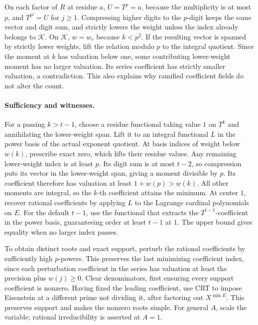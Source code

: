 \documentclass[11pt]{article}
\begin{document}
On each factor of \(R\) at residue \(a\), \(U=T^p=a\),
because the multiplicity is at most \(p\), and \(T^{p^j}=U\)
for \(j\ge1\). Compressing higher digits to the \(p\)-digit keeps
the same vector and digit sum, and strictly lowers the weight
unless the index already belongs to \(\mathcal K\).
On \(\mathcal K\), \(w=w_r\) because \(k<p^2\).
If the resulting vector is spanned by strictly lower weights,
lift the relation modulo \(p\) to the integral quotient.
Since the moment at \(k\) has valuation below one, some
contributing lower-weight moment has no larger valuation.
Its series coefficient has strictly smaller valuation,
a contradiction. This also explains why ramified coefficient
fields do not alter the count.

\paragraph{Sufficiency and witnesses.}
For a passing \(k>t-1\), choose a residue functional taking value
\(1\) on \(T^k\) and annihilating the lower-weight span.
Lift it to an integral functional \(L\) in the power basis of
the actual exponent quotient. At basis indices of weight below
\(w(k)\), prescribe exact zero, which lifts their residue values.
Any remaining lower-weight index is at least \(p\).
Its digit sum is at most \(t-2\), so compression puts its vector
in the lower-weight span, giving a moment divisible by \(p\).
Its coefficient therefore has valuation at least \(1+w(p)>w(k)\).
All other moments are integral, so the \(k\)-th coefficient
attains the minimum. At center \(1\), recover rational coefficients
by applying \(L\) to the Lagrange cardinal polynomials on \(E\).
For the default \(t-1\), use the functional that extracts the
\(T^{t-1}\)-coefficient in the power basis, guaranteeing order
at least \(t-1\) at \(1\). The upper bound gives equality when
no larger index passes.

To obtain distinct roots and exact support, perturb the rational
coefficients by sufficiently high \(p\)-powers. This preserves the
last minimizing coefficient index, since each perturbation
coefficient in the series has valuation at least the precision
plus \(w(j)\ge0\). Clear denominators, first ensuring every support
coefficient is nonzero. Having fixed the leading coefficient,
use CRT to impose Eisenstein at a different prime not dividing
it, after factoring out \(X^{\min E}\). This preserves support
and makes the nonzero roots simple. For general \(A\), scale
the variable; rational irreducibility is asserted at \(A=1\).
\end{document}
